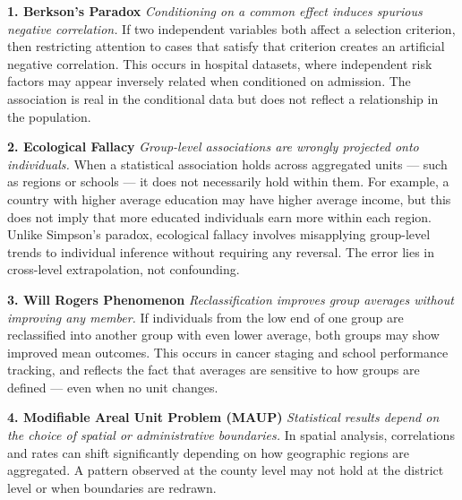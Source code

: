 \vspace{1em}

\begin{tcolorbox}[
  colback=gray!2,
  colframe=gray!60,
  boxrule=0.4pt,
  width=\textwidth,
  arc=1pt,
  left=8pt,
  right=8pt,
  top=6pt,
  bottom=6pt,
  shadow={0mm}{-0.5mm}{0mm}{gray!30}
]

\textbf{1. Berkson’s Paradox}  
\emph{Conditioning on a common effect induces spurious negative correlation.}  
If two independent variables both affect a selection criterion, then restricting attention to cases that satisfy that criterion creates an artificial negative correlation. This occurs in hospital datasets, where independent risk factors may appear inversely related when conditioned on admission. The association is real in the conditional data but does not reflect a relationship in the population.

\vspace{1em}

\textbf{2. Ecological Fallacy}  
\emph{Group-level associations are wrongly projected onto individuals.}  
When a statistical association holds across aggregated units — such as regions or schools — it does not necessarily hold within them. For example, a country with higher average education may have higher average income, but this does not imply that more educated individuals earn more within each region. Unlike Simpson’s paradox, ecological fallacy involves misapplying group-level trends to individual inference without requiring any reversal. The error lies in cross-level extrapolation, not confounding.

\vspace{1em}

\textbf{3. Will Rogers Phenomenon}  
\emph{Reclassification improves group averages without improving any member.}  
If individuals from the low end of one group are reclassified into another group with even lower average, both groups may show improved mean outcomes. This occurs in cancer staging and school performance tracking, and reflects the fact that averages are sensitive to how groups are defined — even when no unit changes.

\vspace{1em}

\textbf{4. Modifiable Areal Unit Problem (MAUP)}  
\emph{Statistical results depend on the choice of spatial or administrative boundaries.}  
In spatial analysis, correlations and rates can shift significantly depending on how geographic regions are aggregated. A pattern observed at the county level may not hold at the district level or when boundaries are redrawn.


\end{tcolorbox}
